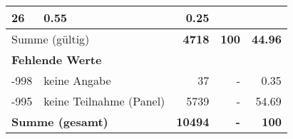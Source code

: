 \begin{longtable}{lXrrr}
       \num{26} &
       \num[round-mode=places,round-precision=2]{0,55} &
         \num[round-mode=places,round-precision=2]{0,25} \\
     \midrule
     \multicolumn{2}{l}{Summe (gültig)} &
       \textbf{\num{4718}} &
     \textbf{100} &
       \textbf{\num[round-mode=places,round-precision=2]{44,96}} \\
     \multicolumn{5}{l}{\textbf{Fehlende Werte}}\\
       -998 &
       keine Angabe &
         \num{37} &
        - &
         \num[round-mode=places,round-precision=2]{0,35} \\
       -995 &
       keine Teilnahme (Panel) &
         \num{5739} &
        - &
         \num[round-mode=places,round-precision=2]{54,69} \\
     \midrule
     \multicolumn{2}{l}{\textbf{Summe (gesamt)}} &
          \textbf{\num{10494}} &
        \textbf{-} &
        \textbf{100} \\
     \bottomrule
     \end{longtable}
     
